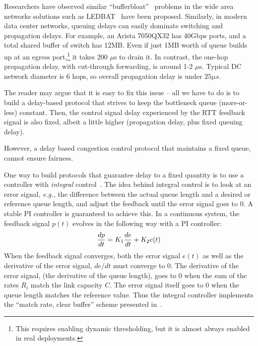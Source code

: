 Researchers have observed similar ``bufferbloat''~\cite{bufferbloat} problems in
the wide area networks solutions such as LEDBAT~\cite{ledbat} have been
proposed. Similarly, in modern data center networks, queuing delays can easily
dominate switching and propagation delays.  For example, an Arista 7050QX32 has
40Gbps ports, and a total shared buffer of switch has 12MB.  Even if just 1MB
worth of queue builds up at an egress port,\footnote{This requires enabling
dynamic thresholding, but it is almost always enabled in real deployments.} it
takes 200 $\mu$s to drain it. In contrast, the one-hop propagation delay, with
cut-through forwarding, is around 1-2 $\mu$s.  Typical DC network diameter is 6
hops, so overall propagation delay is under $25\mu s$.

The reader may argue that it is easy to fix this issue  -- all we have to do is
to build a delay-based protocol that strives to keep the  bottleneck queue
(more-or-less) constant. Then, the control signal delay experienced by the RTT
feedback signal is also fixed, albeit a little higher (propagation delay, plus
fixed queuing delay). 

However, a delay based congestion control protocol that maintains a fixed queue,
cannot ensure fairness.

One way to build protocols that guarantee delay to a fixed quantity is to use
a controller with \emph{integral} control~\cite{hollot2001designing,REM}.  The idea behind integral control
is to look at an error signal, {\em e.g.,} the difference between the actual queue
length and a desired or reference queue length, and adjust the feedback until
the error signal goes to 0. A stable PI controller is guaranteed to achieve
this. In a continuous system, the feedback signal $p(t)$ evolves in the
following way with a PI controller:
\begin{equation}
\small
\frac{dp}{dt} = K_1 \frac{de}{dt}+K_2e(t)
\end{equation}
When the feedback signal converges, both the error signal $e(t)$ as
well as the derivative of the error signal, $de/dt$ must converge to
0. The derivative of the error signal, (the derivative of the queue length), goes to 0
when the sum of the rates $R_i$ match the link capacity $C$. The error signal itself goes to 0
when the queue length matches the reference value. Thus the integral
controller implements the ``match rate, clear buffer'' scheme
presented in~\cite{REM}. 

